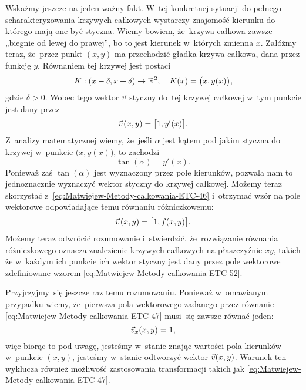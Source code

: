 \documentclass[a4paper,11pt]{article}
\numberwithin{equation}{section}
\begin{document}
Wskażmy jeszcze na jeden ważny fakt. W~tej konkretnej sytuacji do pełnego
scharakteryzowania krzywych całkowych wystarczy znajomość kierunku do
którego mają one być styczna. Wiemy bowiem, że~krzywa całkowa zawsze
„biegnie od lewej do prawej”, bo to jest kierunek w~których zmienna $x$.
Załóżmy teraz, że~przez punkt $( x, y )$ ma przechodzić gładka krzywa
całkowa, dana przez funkcję $y$. Równaniem tej krzywej jest postaci
\begin{equation}
  \label{eq:Uwagi-do-konkrentych-stron-30}
  K : ( x - \delta, x + \delta ) \to \mathbb{R}^{ 2 }, \quad
  K( x ) = \big( x, y( x ) \big),
\end{equation}
gdzie $\delta > 0$. Wobec tego wektor $\vec{v}$ styczny do~tej krzywej całkowej
w~tym punkcie jest dany przez
\begin{equation}
  \label{eq:Uwagi-do-konkrentych-stron-31}
  \vec{v} \hspace{0.09em} ( x, y ) =
  \big[ 1, y'( x ) \big].
\end{equation}
Z~analizy matematycznej wiemy, że~jeśli $\alpha$ jest kątem pod jakim styczna do
krzywej w~punkcie $\big( x, y( x ) \big)$, to zachodzi
\begin{equation}
  \label{eq:Uwagi-do-konkrentych-stron-32}
  \tan( \alpha ) = y'( x ).
\end{equation}
Ponieważ zaś $\tan( \alpha )$ jest wyznaczony przez pole kierunków, pozwala nam
to jednoznacznie wyznaczyć wektor styczny do krzywej całkowej. Możemy teraz
skorzystać z~\eqref{eq:Matwiejew-Metody-calkowania-ETC-46} i~otrzymać wzór
na pole wektorowe odpowiadające temu równaniu różniczkowemu:
\begin{equation}
  \label{eq:Uwagi-do-konkrentych-stron-33}
  \vec{v} \hspace{0.09em} ( x, y ) =
  \big[ 1, f( x, y ) \big].
\end{equation}
Możemy teraz odwrócić rozumowanie i~stwierdzić, że~rozwiązanie równania
różniczkowego oznacza znalezienie krzywych całkowych na płaszczyźnie $xy$,
takich że w~każdym ich punkcie ich wektor styczny jest dany przez pole
wektorowe zdefiniowane wzorem \eqref{eq:Matwiejew-Metody-calkowania-ETC-52}.

Przyjrzyjmy~się jeszcze raz temu rozumowaniu. Ponieważ w~omawianym
przypadku wiemy, że~pierwsza pola wektorowego zadanego przez równanie
\eqref{eq:Matwiejew-Metody-calkowania-ETC-47} musi~się zawsze równać jeden:
\begin{equation}
  \label{eq:Uwagi-do-konkrentych-stron-34}
  \vec{v}_{ x }( x, y ) = 1,
\end{equation}
więc biorąc to pod uwagę, jesteśmy w~stanie znając wartości pola kierunków
w~punkcie $( x, y )$, jesteśmy w~stanie odtworzyć wektor $\vec{v}( x, y )$.
Warunek ten wyklucza również możliwość zastosowania transformacji takich jak
\eqref{eq:Matwiejew-Metody-calkowania-ETC-47}.
\end{document}
